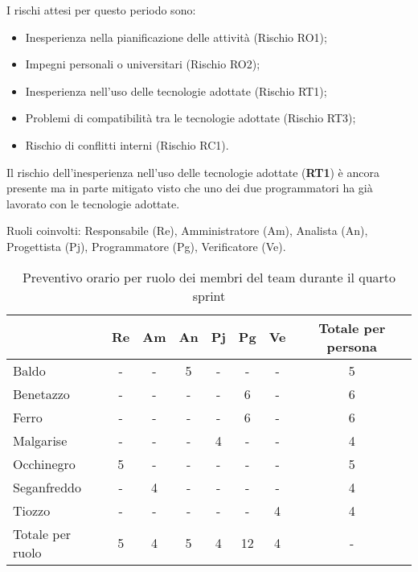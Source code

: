 I rischi attesi per questo periodo sono:
\begin{itemize}
    \item Inesperienza nella pianificazione delle attività (Rischio RO1);
    \item Impegni personali o universitari (Rischio RO2);
    \item Inesperienza nell'uso delle tecnologie adottate (Rischio RT1);
    \item Problemi di compatibilità tra le tecnologie adottate (Rischio RT3);
    \item Rischio di conflitti interni (Rischio RC1).
\end{itemize}
Il rischio dell'inesperienza nell'uso delle tecnologie adottate (\textbf{RT1}) è ancora presente ma in parte mitigato visto che uno dei
due programmatori ha già lavorato con le tecnologie adottate.

Ruoli coinvolti: Responsabile (Re), Amministratore (Am), Analista (An), Progettista (Pj), Programmatore (Pg), Verificatore (Ve).
\begin{table}[!h]
    \centering
    \begin{tabular}{ | l | c | c | c | c | c | c | c | }
        \hline
        \textbf{} & \textbf{Re} & \textbf{Am} &\textbf{An} & \textbf{Pj} & \textbf{Pg} & \textbf{Ve} & \textbf{Totale per persona} \\
        \hline
        Baldo            &  -   &  -   &  5   &  -   &  -   &  -   &  5   \\
        Benetazzo        &  -   &  -   &  -   &  -   &  6   &  -   &  6   \\
        Ferro            &  -   &  -   &  -   &  -   &  6   &  -   &  6   \\
        Malgarise        &  -   &  -   &  -   &  4   &  -   &  -   &  4   \\
        Occhinegro       &  5   &  -   &  -   &  -   &  -   &  -   &  5   \\
        Seganfreddo      &  -   &  4   &  -   &  -   &  -   &  -   &  4   \\
        Tiozzo           &  -   &  -   &  -   &  -   &  -   &  4   &  4   \\
        \hline
        Totale per ruolo &  5   &  4   &  5   &  4   &  12   &  4   &  -   \\
        \hline
    \end{tabular}
    \caption{Preventivo orario per ruolo dei membri del team durante il quarto sprint}
    \label{tab:25}
\end{table}

